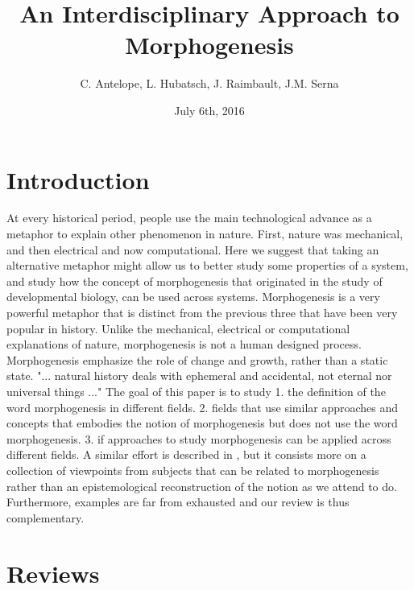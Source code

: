\documentclass{article}
\begin{document}
\title{An Interdisciplinary Approach to Morphogenesis}

\author{C. Antelope, L. Hubatsch, J. Raimbault, J.M. Serna}

\date{July 6th, 2016}

\maketitle

\section{Introduction}

At every historical period, people use the main technological advance as a metaphor to explain other phenomenon in nature. First, nature was mechanical, and then electrical and now computational. Here we suggest that taking an alternative metaphor might allow us to better study some properties of a system, and study how the concept of morphogenesis that originated in the study of developmental biology, can be used across systems. Morphogenesis is a very powerful metaphor that is distinct from the previous three that have been very popular in history. Unlike the mechanical, electrical or computational explanations of nature, morphogenesis is not a human designed process. Morphogenesis emphasize the role of change and growth, rather than a static state. "... natural history deals with ephemeral and accidental, not eternal nor universal things ..." \cite{thompson1942growth} The goal of this paper is to study 1. the definition of the word morphogenesis in different fields. 2. fields that use similar approaches and concepts that embodies the notion of morphogenesis but does not use the word morphogenesis. 3. if approaches to study morphogenesis can be applied across different fields. A similar effort is described in \cite{bourgine2010morphogenesis}, but it consists more on a collection of viewpoints from subjects that can be related to morphogenesis rather than an epistemological reconstruction of the notion as we attend to do. Furthermore, examples are far from exhausted and our review is thus complementary.


\section{Reviews}
\end{document}
